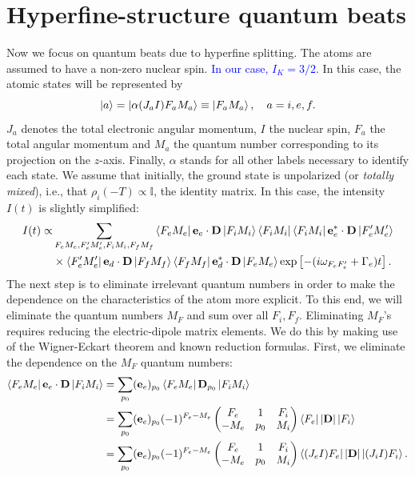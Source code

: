 \documentclass[11pt]{article}
\newcommand{\al}{\alpha}
\newcommand{\lb}{\left[}
\newcommand{\rb}{\right]}
\newcommand{\tj}[6]{ \begin{pmatrix}
		#1 & #2 & #3 \\
		#4 & #5 & #6 
\end{pmatrix}}
\begin{document}
\section{Hyperfine-structure quantum beats}
Now we focus on quantum beats due to hyperfine splitting. The atoms are assumed to have a non-zero nuclear spin. \textcolor{blue}{In our case, $I_K = 3/2$.} In this case, the atomic states will be represented by 
\begin{equation}
\ket{a} = \ket{\al(J_a I) F_a M_a} \equiv \ket{F_a M_a}, \quad a = i,e,f.
\end{equation}
$J_a$ denotes the total electronic angular momentum, $I$ the nuclear spin, $F_a$ the total angular momentum and $M_a$ the quantum number corresponding to its projection on the $z$-axis. Finally, $\al$ stands for all other labels necessary to identify each state. We assume that initially, the ground state is unpolarized (or \textit{totally mixed}), i.e., that $\rho_i(-T) \propto \mathbb{I}$, the identity matrix. In this case, the intensity $I(t)$ is slightly simplified:
\begin{align}
I(t) \propto &\sum_{F_eM_e,F'_eM'_e,F_iM_i,F_fM_f} \bra{F_eM_e} \mathbf{e}_e \cdot \mathbf{D} \ket{F_iM_i} \bra{F_iM_i}  \bra{F_i M_i} \mathbf{e}_e^* \cdot \mathbf{D} \ket{F'_eM'_e} \nonumber \\
&\times \bra{F'_eM'_e}\mathbf{e}_d \cdot \mathbf{D} \ket{F_fM_f}\bra{F_fM_f}\mathbf{e}_d^* \cdot \mathbf{D} \ket{F_eM_e} \exp\lb -(i\omega_{F_eF'_e} + \Gamma_e) t \rb.
\end{align}
The next step is to eliminate irrelevant quantum numbers in order to make the dependence on the characteristics of the atom more explicit. To this end, we will eliminate the quantum numbers $M_F$ and sum over all $F_i, F_f$. Eliminating $M_F$'s requires reducing the electric-dipole matrix elements. We do this by making use of the Wigner-Eckart theorem and known reduction formulas. First, we eliminate the dependence on the $M_F$ quantum numbers:
\begin{align*}
\bra{F_e M_e} \mathbf{e}_e \cdot \mathbf{D} \ket{F_i M_i}
&=  \sum_{p_0} (\mathbf{e}_e)_{p_0} \bra{F_e M_e} \mathbf{D}_{p_0} \ket{F_i M_i}\\
&= \sum_{p_0} (\mathbf{e}_e)_{p_0} (-1)^{F_e - M_e} \tj{F_e}{1}{F_i}{-M_e}{p_0}{M_i} \bra{F_e} \abs{\mathbf{D}} \ket{F_i}\\
&= \sum_{p_0} (\mathbf{e}_e)_{p_0} (-1)^{F_e - M_e} \tj{F_e}{1}{F_i}{-M_e}{p_0}{M_i} \bra{(J_e I) F_e} \abs{\mathbf{D}} \ket{(J_i I)F_i}.
\end{align*}
\end{document}
